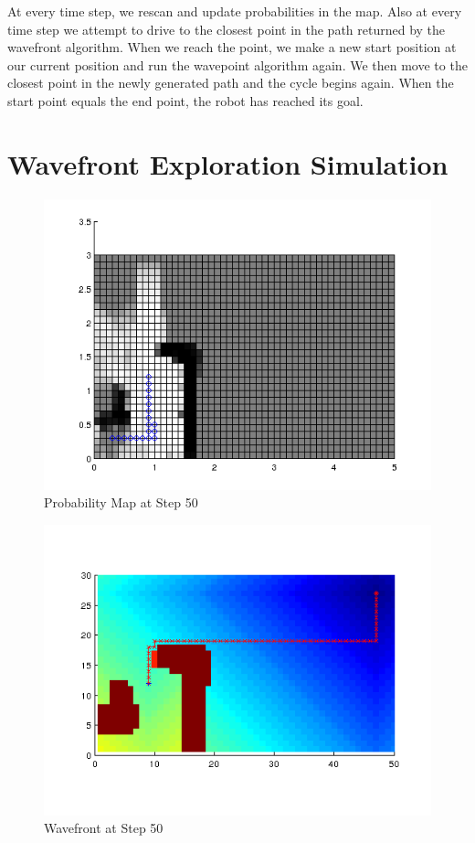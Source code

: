 \documentclass[12pt]{article}
\begin{document}
At every time step, we rescan and update probabilities in the map. Also at every time step we attempt to drive to the closest point in the path returned by the wavefront algorithm. When we reach the point, we make a new start position at our current position and run the wavepoint algorithm again. We then move to the closest point in the newly generated path and the cycle begins again. When the start point equals the end point, the robot has reached its goal. 

 \newpage
\singlespacing
\section{Wavefront Exploration Simulation}
\setlength{\parindent}{1cm}

\begin{figure}[ht]
\hspace{0.5cm}
\centering
\includegraphics[scale=0.7]{Pictures/50_dt_scan.png}
\caption{Probability Map at Step 50}
\end{figure}

\begin{figure}[ht]
\hspace{0.5cm}
\centering
\includegraphics[scale=0.7]{Pictures/50_dt_wave.png}
\caption{Wavefront at Step 50}
\end{figure}
\end{document}
